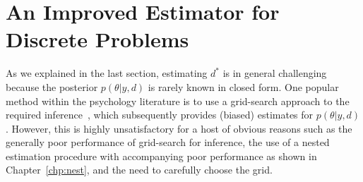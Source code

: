 
\section{An Improved Estimator for Discrete Problems}
\label{sec:bo-design}

As we explained in the last section, estimating $d^*$ is in general challenging
because the posterior $p(\theta |y, d)$ is rarely known in closed form.  
One popular method within the psychology literature is to use a grid-search approach 
to the required inference~\citep{PSImethod:1999, Prins:2013gr}, 
which subsequently provides (biased) estimates for $p(\theta |y, d)$.
However, this is highly unsatisfactory for a host of obvious reasons such as the generally
poor performance of grid-search for inference, the use of a nested estimation procedure
with accompanying poor performance as shown in Chapter~\ref{chp:nest}, and the need to carefully
choose the grid.


